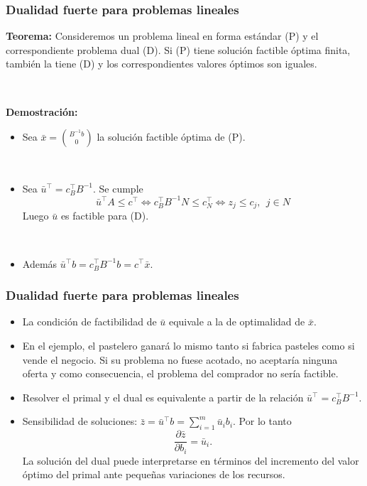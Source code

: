 \documentclass{beamer}
\begin{document}
\begin{frame}
\frametitle{Dualidad fuerte para problemas lineales}

\textbf{Teorema:} Consideremos un problema lineal en forma estándar (P) y el correspondiente problema dual (D). Si (P) tiene solución factible óptima finita, también la tiene (D) y los correspondientes valores óptimos son iguales. 

\

{\scriptsize

\textbf{Demostración:} 

\begin{itemize}
\item Sea $\bar{x}={B^{-1}b\choose 0}$ la solución factible óptima de (P).

\

\item Sea $\bar{u}^\top = c_B^\top B^{-1}$. Se cumple
\[
\bar{u}^\top A \leq c^\top \Leftrightarrow c_B^\top B^{-1}N\leq c_N^\top \Leftrightarrow z_j\leq c_j,\ \ j\in N
\]
Luego $\bar{u}$ es factible para (D).

\

\item Además $\bar{u}^\top b=c_B^\top B^{-1}b=c^\top \bar{x}$.
\end{itemize}
}

 \end{frame}
\begin{frame}
\frametitle{Dualidad fuerte para problemas lineales}

\begin{itemize}



\item La condición de factibilidad de $\bar{u}$ equivale a la de optimalidad de $\bar{x}$.


\item En el ejemplo, el pastelero ganará lo mismo tanto si fabrica pasteles como si vende el negocio. Si su problema no fuese acotado, no aceptaría ninguna oferta y como consecuencia, el problema del comprador no sería factible.

\item Resolver el primal y el dual es equivalente a partir de la relación $\bar{u}^\top =c_B^\top B^{-1}$.


\item Sensibilidad de soluciones:
$
\bar{z} = \bar{u}^\top b = \sum_{i=1}^m \bar{u}_i b_i.
$
Por lo tanto
\[
\frac{\partial \bar{z}}{\partial b_i} = \bar{u}_i.
\]
La solución del dual puede interpretarse en términos del incremento del valor óptimo del primal ante pequeñas variaciones de los recursos. 



\end{itemize}

\end{frame}
\end{document}
